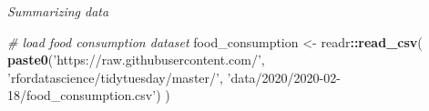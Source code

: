 \documentclass[ignorenonframetext,]{beamer}
\newenvironment{Shaded}{\begin{snugshade}}{\end{snugshade}}
\newcommand{\CommentTok}[1]{\textcolor[rgb]{0.56,0.35,0.01}{\textit{#1}}}
\newcommand{\KeywordTok}[1]{\textcolor[rgb]{0.13,0.29,0.53}{\textbf{#1}}}
\newcommand{\NormalTok}[1]{#1}
\newcommand{\OperatorTok}[1]{\textcolor[rgb]{0.81,0.36,0.00}{\textbf{#1}}}
\newcommand{\StringTok}[1]{\textcolor[rgb]{0.31,0.60,0.02}{#1}}
\begin{document}
\begin{frame}[standout]{}
\protect\hypertarget{section-3}{}

\begin{center}
        
    \vspace{2.3em}
    \color{white}\textit{\Huge\gar Summarizing data}
\end{center}

\end{frame}

\begin{frame}[fragile]{}
\protect\hypertarget{section-4}{}

\scriptsize

\begin{Shaded}
\begin{Highlighting}[]
\CommentTok{# load food consumption dataset }
\NormalTok{food_consumption <-}
\StringTok{  }\NormalTok{readr}\OperatorTok{::}\KeywordTok{read_csv}\NormalTok{(}
    \KeywordTok{paste0}\NormalTok{(}\StringTok{'https://raw.githubusercontent.com/'}\NormalTok{,}
           \StringTok{'rfordatascience/tidytuesday/master/'}\NormalTok{,}
           \StringTok{'data/2020/2020-02-18/food_consumption.csv'}\NormalTok{)}
\NormalTok{    )}
\end{Highlighting}
\end{Shaded}

\end{frame}
\end{document}
